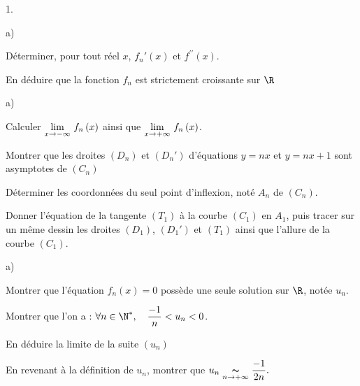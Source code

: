 \documentclass[11pt]{article}%
\begin{document}
\begin{noliste}{1.}
 \setlength{\itemsep}{4mm}
\item
\begin{noliste}{a)}
 \setlength{\itemsep}{2mm}
\item Déterminer, pour tout réel $x$, $f_{n}{\prime }\left(
x\right) $ et $f^{\prime \prime }\left( x\right) $.

\item En déduire que la fonction $f_{n}$ est strictement croissante sur
$\R$
\end{noliste}

\item
\begin{noliste}{a)}
 \setlength{\itemsep}{2mm}
\item Calculer ${\displaystyle \lim_{x\rightarrow -\infty } \ }f_{n}\left( x\right) $
ainsi que
${\displaystyle \lim_{x\rightarrow + \infty } \ }f_{n}\left( x\right) $.

\item Montrer que les droites $\left( D_{n}\right) $ et $\left(
D_{n}{\prime }\right) $ d'équations $y = nx$ et $y = nx + 1$ sont
asymptotes
de $\left( C_{n}\right) $

\item Déterminer les coordonnées du seul point d'inflexion, noté
$A_{n}$ de $\left( C_{n}\right) $.

\item Donner l'équation de la tangente $\left( T_{1}\right) $ à la
courbe $\left( C_{1}\right) $ en $A_{1}$, puis tracer sur un même
dessin
les droites $\left( D_{1}\right) $, $\left( D_{1}{\prime }\right) $ et
$\left( T_{1}\right) $ ainsi que l'allure de la courbe $\left(
C_{1}\right) $.
\end{noliste}

\item
\begin{noliste}{a)}
 \setlength{\itemsep}{2mm}
\item Montrer que l'équation $f_{n}\left( x\right) = 0$ possède une
seule solution sur $\R$, notée $u_{n}$.

\item Montrer que l'on a : $\forall n\in \N^{\ast },\quad
\dfrac{-1}{n}<u_{n}<0$.

\item En déduire la limite de la suite $\left( u_{n}\right) $

\item En revenant à la définition de $u_{n}$, montrer que
$u_{n}\underset{n\rightarrow + \infty }{\thicksim }\dfrac{-1}{2n}.$
\end{noliste}
\end{noliste}
\end{document}
